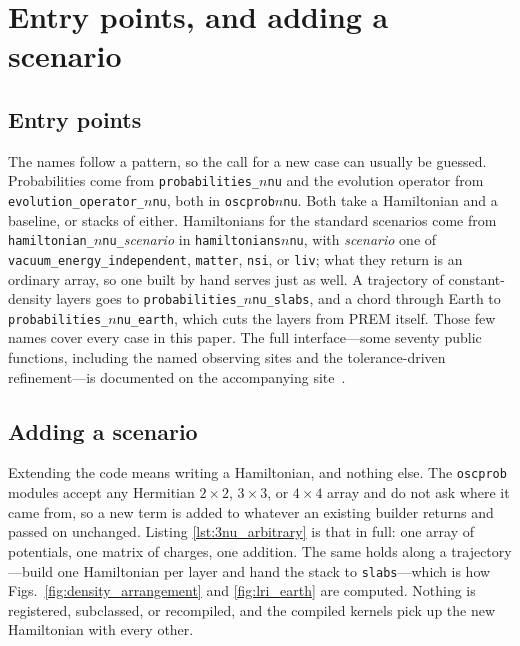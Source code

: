 \documentclass[final,5p,times,twocolumn,sort,compress]{elsarticle}
\begin{document}

\section{Entry points, and adding a scenario}
\label{app:structure}
\appresetfloats






\subsection{Entry points}

The names follow a pattern, so the call for a new case can usually be guessed.  Probabilities come from {\tt probabilities\_$n$nu} and the evolution operator from {\tt evolution\_operator\_$n$nu}, both in {\tt oscprob$n$nu}.  Both take a Hamiltonian and a baseline, or stacks of either.  Hamiltonians for the standard scenarios come from {\tt hamiltonian\_$n$nu\_}\emph{scenario} in {\tt hamiltonians$n$nu}, with \emph{scenario} one of {\tt vacuum\_energy\_independent}, {\tt matter}, {\tt nsi}, or {\tt liv}; what they return is an ordinary array, so one built by hand serves just as well.  A trajectory of constant-density layers goes to {\tt probabilities\_$n$nu\_slabs}, and a chord through Earth to {\tt probabilities\_$n$nu\_earth}, which cuts the layers from PREM itself.  Those few names cover every case in this paper.  The full interface---some seventy public functions, including the named observing sites and the tolerance-driven refinement---is documented on the accompanying site\ \cite{NuOscProbExactDocs}.


\subsection{Adding a scenario}

Extending the code means writing a Hamiltonian, and nothing else.  The {\tt oscprob} modules accept any Hermitian $2\times2$, $3\times3$, or $4\times4$ array and do not ask where it came from, so a new term is added to whatever an existing builder returns and passed on unchanged.  Listing \ref{lst:3nu_arbitrary} is that in full: one array of potentials, one matrix of charges, one addition.  The same holds along a trajectory---build one Hamiltonian per layer and hand the stack to {\tt slabs}---which is how Figs.~\ref{fig:density_arrangement} and \ref{fig:lri_earth} are computed.  Nothing is registered, subclassed, or recompiled, and the compiled kernels pick up the new Hamiltonian with every other.
\end{document}
